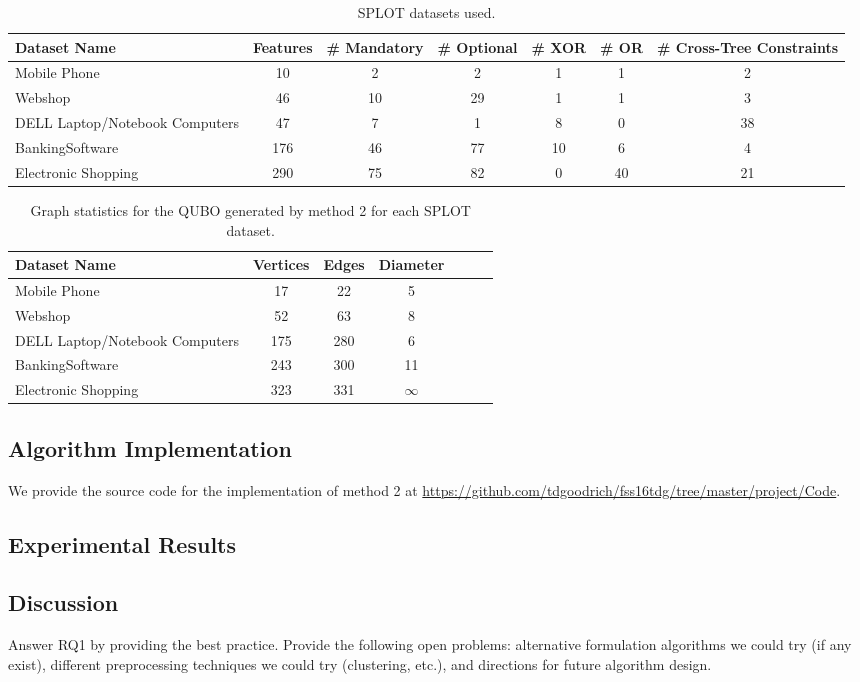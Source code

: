 \documentclass{sig-alternate-05-2015}
\begin{document}
\begin{table}[!h]
\centering
\begin{tabular}{l c c c c c c}
\toprule
Dataset Name & Features & \# Mandatory & \# Optional & \# XOR & \# OR & \# Cross-Tree Constraints\\
\midrule
Mobile Phone & 10 & 2 & 2 & 1 & 1 & 2\\
Webshop & 46 & 10 & 29 & 1 & 1 & 3\\
DELL Laptop/Notebook Computers & 47 & 7 & 1 & 8 & 0 & 38\\
BankingSoftware & 176 & 46 & 77 & 10 & 6 & 4\\
Electronic Shopping & 290 & 75 & 82 & 0 & 40 & 21\\
\bottomrule
\end{tabular}
\label{table:splot}
\caption{SPLOT datasets used.}
\end{table}


\begin{table}[!h]
\centering
\begin{tabular}{l c c c c c c}
\toprule
Dataset Name & Vertices & Edges & Diameter\\
\midrule
Mobile Phone & 17 & 22 & 5\\
Webshop & 52 & 63 & 8\\
DELL Laptop/Notebook Computers & 175 & 280 & 6\\
BankingSoftware & 243 & 300 & 11\\
Electronic Shopping & 323 & 331 & $\infty$\\
\bottomrule
\end{tabular}
\label{table:results}
\caption{Graph statistics for the QUBO generated by method 2 for each SPLOT dataset.}
\end{table}

\subsection{Algorithm Implementation}
We provide the source code for the implementation of method 2 at \url{https://github.com/tdgoodrich/fss16tdg/tree/master/project/Code}.

\subsection{Experimental Results}

\subsection{Discussion}
Answer RQ1 by providing the best practice. Provide the following open problems: alternative formulation algorithms we could try (if any exist), different preprocessing techniques we could try (clustering, etc.), and directions for future algorithm design.
\end{document}
